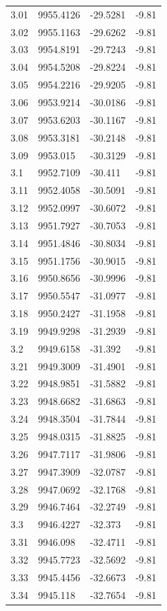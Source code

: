 \begin{table}[H]
\begin{tabular}{llll}
3.01 & 9955.4126 & -29.5281 & -9.81 \\
3.02 & 9955.1163 & -29.6262 & -9.81 \\
3.03 & 9954.8191 & -29.7243 & -9.81 \\
3.04 & 9954.5208 & -29.8224 & -9.81 \\
3.05 & 9954.2216 & -29.9205 & -9.81 \\
3.06 & 9953.9214 & -30.0186 & -9.81 \\
3.07 & 9953.6203 & -30.1167 & -9.81 \\
3.08 & 9953.3181 & -30.2148 & -9.81 \\
3.09 & 9953.015 & -30.3129 & -9.81 \\
3.1 & 9952.7109 & -30.411 & -9.81 \\
3.11 & 9952.4058 & -30.5091 & -9.81 \\
3.12 & 9952.0997 & -30.6072 & -9.81 \\
3.13 & 9951.7927 & -30.7053 & -9.81 \\
3.14 & 9951.4846 & -30.8034 & -9.81 \\
3.15 & 9951.1756 & -30.9015 & -9.81 \\
3.16 & 9950.8656 & -30.9996 & -9.81 \\
3.17 & 9950.5547 & -31.0977 & -9.81 \\
3.18 & 9950.2427 & -31.1958 & -9.81 \\
3.19 & 9949.9298 & -31.2939 & -9.81 \\
3.2 & 9949.6158 & -31.392 & -9.81 \\
3.21 & 9949.3009 & -31.4901 & -9.81 \\
3.22 & 9948.9851 & -31.5882 & -9.81 \\
3.23 & 9948.6682 & -31.6863 & -9.81 \\
3.24 & 9948.3504 & -31.7844 & -9.81 \\
3.25 & 9948.0315 & -31.8825 & -9.81 \\
3.26 & 9947.7117 & -31.9806 & -9.81 \\
3.27 & 9947.3909 & -32.0787 & -9.81 \\
3.28 & 9947.0692 & -32.1768 & -9.81 \\
3.29 & 9946.7464 & -32.2749 & -9.81 \\
3.3 & 9946.4227 & -32.373 & -9.81 \\
3.31 & 9946.098 & -32.4711 & -9.81 \\
3.32 & 9945.7723 & -32.5692 & -9.81 \\
3.33 & 9945.4456 & -32.6673 & -9.81 \\
3.34 & 9945.118 & -32.7654 & -9.81 \\

\end{tabular}
\end{table}
